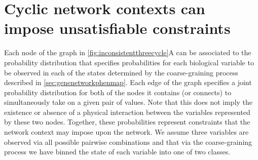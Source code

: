 \section{Cyclic network contexts can impose unsatisfiable constraints}\label{sec:cycliccontextunsatisfiableconstraints}


Each node of the \SH{} graph in \ref{fig:inconsistentthreecycle}A can be associated to the probability distribution that specifies probabilities for each biological variable to be observed in each of the states determined by the coarse-graining process described in \ref{sec:genenetworkphenmap}. Each edge of the graph specifies a joint probability distribution for both of the nodes it contains (or connects) to simultaneously take on a given pair of values. Note that this does not imply the existence or absence of a physical interaction between the variables represented by these two nodes. Together, these probabilities represent constraints that the network context may impose upon the network.
We assume three variables are observed via all possible pairwise combinations and that via the coarse-graining process we have binned the state of each variable into one of two classes.
